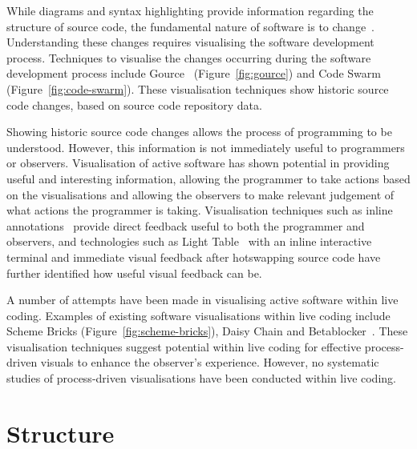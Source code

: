 While diagrams and syntax highlighting provide information regarding the structure of source code, the fundamental nature of software is to change~\cite{Brooks1995}. Understanding these changes requires visualising the software development process. Techniques to visualise the changes occurring during the software development process include Gource~\cite{Caudwell2010} (Figure~\ref{fig:gource}) and Code Swarm~\cite{Ogawa2012} (Figure~\ref{fig:code-swarm}). These visualisation techniques show historic source code changes, based on source code repository data.

Showing historic source code changes allows the process of programming to be understood. However, this information is not immediately useful to programmers or observers. Visualisation of active software has shown potential in providing useful and interesting information, allowing the programmer to take actions based on the visualisations and allowing the observers to make relevant judgement of what actions the programmer is taking. Visualisation techniques such as inline annotations~\cite{Swift2013,Beck2013} provide direct feedback useful to both the programmer and observers, and technologies such as Light Table~\cite{Kodowa2014} with an inline interactive terminal and immediate visual feedback after hotswapping source code have further identified how useful visual feedback can be.

A number of attempts have been made in visualising active software within live coding. Examples of existing software visualisations within live coding include Scheme Bricks (Figure~\ref{fig:scheme-bricks}), Daisy Chain and Betablocker~\cite{McLean2010a}. These visualisation techniques suggest potential within live coding for effective process-driven visuals to enhance the observer's experience. However, no systematic studies of process-driven visualisations have been conducted within live coding.


\section{Structure}

